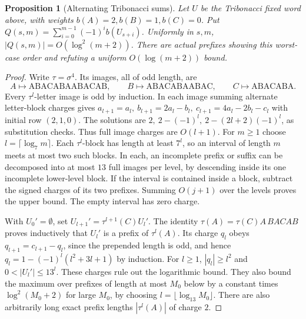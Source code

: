 \documentclass[11pt,reqno]{amsart}
\newtheorem{proposition}[theorem]{Proposition}
\theoremstyle{definition}
\theoremstyle{remark}
\numberwithin{equation}{section}
\begin{document}
\begin{proposition}[Alternating Tribonacci sums]\label{m9:alternating}
Let \(U\) be the Tribonacci fixed word above, with weights
\(b(A)=2,b(B)=1,b(C)=0\). Put
\(Q(s,m)=\sum_{i=0}^{m-1}(-1)^i b(U_{s+i})\).
Uniformly in \(s,m\), \(|Q(s,m)|=O(\log^2(m+2))\).
There are actual prefixes showing this worst-case order
and refuting a uniform \(O(\log(m+2))\) bound.
\end{proposition}
\begin{proof}
Write \(\tau=\sigma^4\). Its images, all of odd length, are
\[
 A\mapsto\mathrm{ABACABAABACAB},\qquad
 B\mapsto\mathrm{ABACABAABAC},\qquad
 C\mapsto\mathrm{ABACABA}.
\]
Every \(\tau^l\)-letter image is odd by induction.
In each image summing alternate letter-block charges gives
\(a_{l+1}=a_l,\ b_{l+1}=2a_l-b_l,\ c_{l+1}=4a_l-2b_l-c_l\)
with initial row \((2,1,0)\). The solutions are
\(2,\ 2-(-1)^l,\ 2-(2l+2)(-1)^l\), as substitution checks.
Thus full image charges are \(O(l+1)\).
For \(m\ge1\) choose \(l=\lceil\log_7 m\rceil\). Each
\(\tau^l\)-block has length at least \(7^l\), so an interval
of length \(m\) meets at most two such blocks. In each,
an incomplete prefix or suffix can be decomposed into at
most \(13\) full images per level, by descending inside its
one incomplete lower-level block. If the interval is contained
inside a block, subtract the signed charges of its two
prefixes. Summing \(O(j+1)\) over the levels proves the
upper bound. The empty interval has zero charge.

With \(U_0'=\emptyset\), set \(U_{l+1}'=\tau^{l+1}(C)U_l'\).
The identity \(\tau(A)=\tau(C)A\,BACAB\) proves inductively
that \(U_l'\) is a prefix of \(\tau^l(A)\).
Its charge \(q_l\) obeys \(q_{l+1}=c_{l+1}-q_l\), since
the prepended length is odd, and hence
\(q_l=1-(-1)^l(l^2+3l+1)\) by induction.
For \(l\ge1\), \(|q_l|\ge l^2\) and
\(0<|U_l'|\le13^l\). These charges rule out the logarithmic
bound. They also bound the maximum over prefixes of
length at most \(M_0\) below by a constant times
\(\log^2(M_0+2)\) for large \(M_0\), by choosing
\(l=\lfloor\log_{13}M_0\rfloor\). There are also arbitrarily
long exact prefix lengths \(|\tau^l(A)|\) of charge \(2\).
\end{proof}
\end{document}
